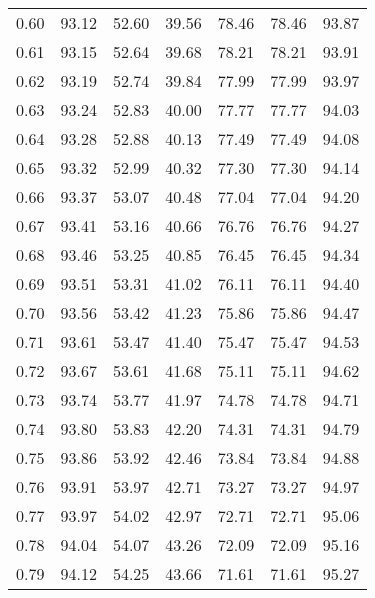 \begin{tabular}{|c|c|c|c|c|c|c|}
      0.60 &     93.12 &     52.60 &      39.56 &   78.46 &      78.46 &         93.87 \\
      0.61 &     93.15 &     52.64 &      39.68 &   78.21 &      78.21 &         93.91 \\
      0.62 &     93.19 &     52.74 &      39.84 &   77.99 &      77.99 &         93.97 \\
      0.63 &     93.24 &     52.83 &      40.00 &   77.77 &      77.77 &         94.03 \\
      0.64 &     93.28 &     52.88 &      40.13 &   77.49 &      77.49 &         94.08 \\
      0.65 &     93.32 &     52.99 &      40.32 &   77.30 &      77.30 &         94.14 \\
      0.66 &     93.37 &     53.07 &      40.48 &   77.04 &      77.04 &         94.20 \\
      0.67 &     93.41 &     53.16 &      40.66 &   76.76 &      76.76 &         94.27 \\
      0.68 &     93.46 &     53.25 &      40.85 &   76.45 &      76.45 &         94.34 \\
      0.69 &     93.51 &     53.31 &      41.02 &   76.11 &      76.11 &         94.40 \\
      0.70 &     93.56 &     53.42 &      41.23 &   75.86 &      75.86 &         94.47 \\
      0.71 &     93.61 &     53.47 &      41.40 &   75.47 &      75.47 &         94.53 \\
      0.72 &     93.67 &     53.61 &      41.68 &   75.11 &      75.11 &         94.62 \\
      0.73 &     93.74 &     53.77 &      41.97 &   74.78 &      74.78 &         94.71 \\
      0.74 &     93.80 &     53.83 &      42.20 &   74.31 &      74.31 &         94.79 \\
      0.75 &     93.86 &     53.92 &      42.46 &   73.84 &      73.84 &         94.88 \\
      0.76 &     93.91 &     53.97 &      42.71 &   73.27 &      73.27 &         94.97 \\
      0.77 &     93.97 &     54.02 &      42.97 &   72.71 &      72.71 &         95.06 \\
      0.78 &     94.04 &     54.07 &      43.26 &   72.09 &      72.09 &         95.16 \\
      0.79 &     94.12 &     54.25 &      43.66 &   71.61 &      71.61 &         95.27 \\

\end{tabular}
